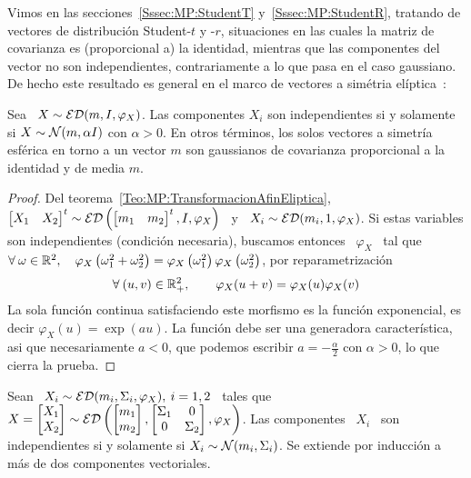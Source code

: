 Vimos   en   las  secciones~\ref{Sssec:MP:StudentT}   y~\ref{Sssec:MP:StudentR},
tratando de  vectores de distribuci\'on  Student-$t$ y -$r$, situaciones  en las
cuales la  matriz de covarianza es  (proporcional a) la  identidad, mientras que
las componentes del  vector no son independientes, contrariamente  a lo que pasa
en  el caso  gaussiano.   De hecho  este resultado  es  general en  el marco  de
vectores a sim\'etria el\'iptica~\cite{BilBre99, Max67}:
%
\begin{teorema}
\label{Teo:MP:MaxwellHershell}
%
  Sea \ $X \sim \mathcal{ED}(m,I,\varphi_X)$. Las componentes $X_i$ son independientes si
  y solamente si $X  \sim \mathcal{N}(m, \alpha I)$ con $\alpha >  0$. En otros t\'erminos,
  los  solos vectores  a simetr\'ia  esf\'erica  en torno  a un  vector $m$  son
  gaussianos de covarianza proporcional a la identidad y de media $m$.
\end{teorema}
%
\begin{proof}
  Del teorema~\ref{Teo:MP:TransformacionAfinEliptica},  \ $\begin{bmatrix} X_1 &
    X_2    \end{bmatrix}^t     \sim    \mathcal{ED}\left(    \begin{bmatrix}     m_1    &
      m_2 \end{bmatrix}^t, I, \varphi_X \right)$ \ y  \ $X_i \sim \mathcal{ED}( m_i , 1 ,
  \varphi_X)$.  Si  estas variables son  independientes (condici\'on necesaria),
  buscamos entonces  \ $\varphi_X$ \ tal  que \ $\forall \:  \omega \in \mathbb{R}^2,
  \quad  \varphi_X\left(  \omega_1^2  +  \omega_2^2  \right)  =  \varphi_X\left(
    \omega_1^2   \right)   \varphi_X\left(    \omega_2^2   \right)$,   \ie   por
  reparametrizaci\'on
  \[
  \forall  \:   (u,v)  \in  \mathbb{R}_+^2,  \qquad   \varphi_X(u+v)  =  \varphi_X(u)
  \varphi_X(v)
  \]
  La  sola  funci\'on  continua  satisfaciendo  este morfismo  es  la  funci\'on
  exponencial, es decir  $\varphi_X(u) = \exp(a u)$.  La  funci\'on debe ser una
  generadora  caracter\'istica, asi  que  necesariamente $a  <  0$, que  podemos
  escribir $a = - \frac{\alpha}{2}$ con $\alpha > 0$, lo que cierra la prueba.
\end{proof}
%
\begin{corolario}%
\label{Cor:MP:MaxwellHershell}
%
Sean \ $X_i \sim \mathcal{ED}( m_i , \Sigma_i , \varphi_X), \: i = 1, 2$ \ tales que \ $X
=  \begin{bmatrix} X_1\\X_2 \end{bmatrix}  \sim \mathcal{ED}\left(  \begin{bmatrix} m_1\\
    m_2   \end{bmatrix}    ,   \begin{bmatrix}   \Sigma_1    &   0   \\    0   &
    \Sigma_2 \end{bmatrix} , \varphi_X \right)$.   Las componentes \ $X_i$ \ son
independientes si y solamente si $X_i  \sim \mathcal{N}(m_i , \Sigma_i)$. Se extiende por
inducci\'on a m\'as de dos componentes vectoriales.
\end{corolario}

